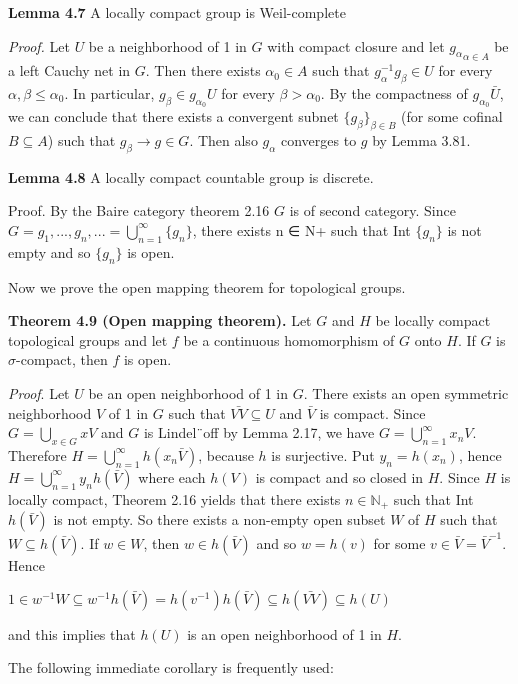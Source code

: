\documentclass[12pt]{article}
\begin{document}
\textbf{Lemma 4.7} A locally compact group is Weil-complete


\emph{Proof.} Let $U$ be a neighborhood of 1 in $G$ with compact closure and let ${g_\alpha}_{\alpha \in A}$ be a left Cauchy net in $G$.
Then there exists $\alpha_0 \in A$ such that $g^{-1}_\alpha g_\beta \in U$ for every $\alpha, \beta \leq \alpha_0$. In particular, $g_\beta \in g_{\alpha_0} U$ for every $\beta > \alpha_0$.
By the compactness of $g_{\alpha_0} \bar{U}$, we can conclude that there exists a convergent subnet $\{g_\beta\}_{\beta \in B}$ (for some cofinal
$B \subseteq A$) such that $g_\beta \to g \in G$. Then also $g_\alpha$ converges to $g$ by Lemma 3.81.


\textbf{Lemma 4.8} A locally compact countable group is discrete.


Proof. By the Baire category theorem 2.16 $G$ is of second category. Since $G = {g_1, . . . , g_n, . . . } = \bigcup^{\infty}_{n=1} \{g_n\}$, 
there exists n ∈ N+ such that Int $\{g_n\}$ is not empty and so $\{g_n\}$ is open.


    Now we prove the open mapping theorem for topological groups.


\textbf{Theorem 4.9 (Open mapping theorem).} Let $G$ and $H$ be locally compact topological groups and let $f$ be a
continuous homomorphism of $G$ onto $H$. If $G$ is $\sigma$-compact, then $f$ is open.


\emph{Proof}. Let $U$ be an open neighborhood of 1 in $G$. There exists an open symmetric neighborhood $V$ of 1 in
$G$ such that $\bar{VV} \subseteq U$ and $\bar{V}$ is compact. Since $G =\bigcup_{x \in G} xV$ and $G$ is Lindel¨off by Lemma 2.17, we have
$G =\bigcup^{\infty}_{n=1} x_n V$. Therefore $H =\bigcup^{\infty}_{n=1} h(x_n \bar{V})$, because $h$ is surjective. Put $y_n = h(x_n)$, hence $H = \bigcup^{\infty}_{n=1} y_n h(\bar{V})$
where each $h(V)$ is compact and so closed in $H$. Since $H$ is locally compact, Theorem 2.16 yields that there
exists $n \in \mathbb{N}_+$ such that Int $h(\bar{V})$ is not empty. So there exists a non-empty open subset $W$ of $H$ such that
$W \subseteq h(\bar{V})$. If $w \in W$, then $w \in h(\bar{V})$ and so $w = h(v)$ for some $v \in \bar{V} = \bar{V}^{-1}$. Hence


    $1 \in w^{-1}W \subseteq w^{-1}h(\bar{V}) = h(v^{-1})h(\bar{V}) \subseteq h(\bar{VV}) \subseteq h(U)$


and this implies that $h(U)$ is an open neighborhood of 1 in $H$.


    The following immediate corollary is frequently used:
\end{document}
